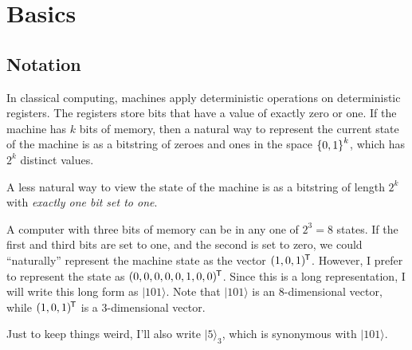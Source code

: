 \newcommand{\braket}[1]{|#1\rangle}
\newcommand{\sqtot}{\frac{\sqrt{2}}{2}}

\section{Basics}

\subsection{Notation}

\begin{remark}
  In classical computing, machines apply deterministic operations on
  deterministic registers. The registers store bits that have a value of
  exactly zero or one. If the machine has $k$ bits of memory, then a
  natural way to represent the current state of the machine is as a
  bitstring of zeroes and ones in the space $\left\{ 0, 1 \right\}^k$, which has
  $2^k$ distinct values.
\end{remark}

\begin{remark}
  A less natural way to view the state of the machine is as a bitstring
  of length $2^k$ with \emph{exactly one bit set to one}.
\end{remark}

\begin{example}
  A computer with three bits of memory can be in any one of $2^3 = 8$
  states. If the first and third bits are set to one, and the second is
  set to zero, we could ``naturally'' represent the machine state as the
  vector $\mathopen{}\left( {1, 0 , 1} \right)\mathclose{}^{\mkern-1.5mu\mathsf{T}}$. However, I prefer to represent the
  state as $\mathopen{}\left( {0, 0, 0, 0, 0, 1, 0, 0} \right)\mathclose{}^{\mkern-1.5mu\mathsf{T}}$. Since this is a long
  representation, I will write this long form as $\braket{101}$. Note
  that $\braket{101}$ is an 8-dimensional vector, while $\mathopen{}\left( {1, 0,
  1} \right)\mathclose{}^{\mkern-1.5mu\mathsf{T}}$ is a 3-dimensional vector.

  Just to keep things weird, I'll also write $\braket{5}_3$, which is
  synonymous with $\braket{101}$.
\end{example}

